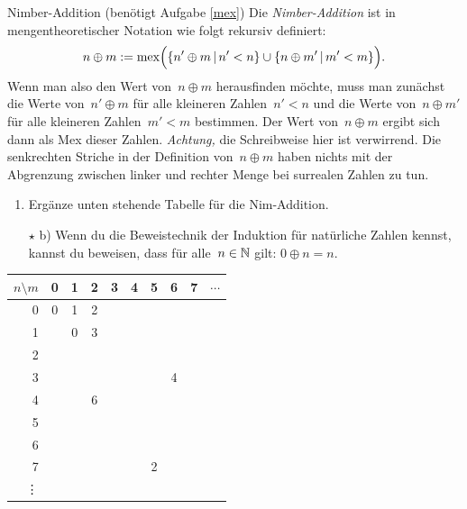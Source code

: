 \documentclass{../zirkelblatt}
\begin{document}
\begin{aufgabe}{Nimber-Addition (benötigt Aufgabe \ref{mex})}
\label{nimber-addition}
Die \emph{Nimber-Addition} ist in mengentheoretischer Notation wie folgt rekursiv definiert:
\[ n \oplus m := \operatorname{mex}\Bigl(\left\{n' \oplus m \,|\, n' < n\right\} \cup
\left\{n \oplus m' \,|\, m' < m\right\}\Bigr). \]
Wenn man also den Wert von~$n \oplus m$ herausfinden möchte, muss man zunächst
die Werte von~$n' \oplus m$ für alle kleineren Zahlen~$n' < n$ und die Werte
von~$n \oplus m'$ für alle kleineren Zahlen~$m' < m$ bestimmen. Der Wert
von~$n \oplus m$ ergibt sich dann als Mex dieser Zahlen. \emph{Achtung,} die
Schreibweise hier ist verwirrend. Die senkrechten Striche in der Definition
von~$n \oplus m$ haben nichts mit der Abgrenzung zwischen linker und rechter
Menge bei surrealen Zahlen zu tun.
\begin{enumerate}
\item Ergänze unten stehende Tabelle für die Nim-Addition.
\item[$\star$ b)] Wenn du die Beweistechnik der Induktion für natürliche Zahlen kennst, kannst
du beweisen, dass für alle~$n \in \mathbb{N}$ gilt: $0 \oplus n = n$.
\end{enumerate}
\begin{center}
  \begin{tabular}{r|ccccccccl}
    $n \setminus m$ & 0 & 1 & 2 & 3 & 4 & 5 & 6 & 7 & $\cdots$ \\\hline
    0 & 0 & 1 & 2 \\
    1 &   & 0 & 3 \\
    2 & \\
    3 & & & & & & & 4 \\
    4 & & & 6 \\
    5 & \\
    6 & \\
    7 & & & & & & 2 \\
    \vdots
  \end{tabular}
\end{center}
\end{aufgabe}
\end{document}
